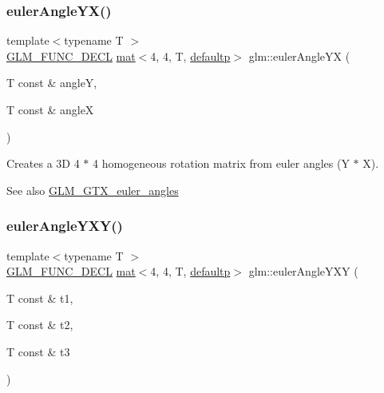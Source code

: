 \subsubsection{\texorpdfstring{euler\+Angle\+Y\+X()}{eulerAngleYX()}}
{\footnotesize\ttfamily template$<$typename T $>$ \\
\hyperlink{setup_8hpp_ab2d052de21a70539923e9bcbf6e83a51}{G\+L\+M\+\_\+\+F\+U\+N\+C\+\_\+\+D\+E\+CL} \hyperlink{structglm_1_1mat}{mat}$<$4, 4, T, \hyperlink{namespaceglm_a36ed105b07c7746804d7fdc7cc90ff25a9d21ccd8b5a009ec7eb7677befc3bf51}{defaultp}$>$ glm\+::euler\+Angle\+YX (\begin{DoxyParamCaption}\item[{T const \&}]{angleY,  }\item[{T const \&}]{angleX }\end{DoxyParamCaption})}

Creates a 3D 4 $\ast$ 4 homogeneous rotation matrix from euler angles (Y $\ast$ X). \begin{DoxySeeAlso}{See also}
\hyperlink{group__gtx__euler__angles}{G\+L\+M\+\_\+\+G\+T\+X\+\_\+euler\+\_\+angles} 
\end{DoxySeeAlso}
\mbox{\label{group__gtx__euler__angles_ga750fba9894117f87bcc529d7349d11de}} 
\subsubsection{\texorpdfstring{euler\+Angle\+Y\+X\+Y()}{eulerAngleYXY()}}
{\footnotesize\ttfamily template$<$typename T $>$ \\
\hyperlink{setup_8hpp_ab2d052de21a70539923e9bcbf6e83a51}{G\+L\+M\+\_\+\+F\+U\+N\+C\+\_\+\+D\+E\+CL} \hyperlink{structglm_1_1mat}{mat}$<$4, 4, T, \hyperlink{namespaceglm_a36ed105b07c7746804d7fdc7cc90ff25a9d21ccd8b5a009ec7eb7677befc3bf51}{defaultp}$>$ glm\+::euler\+Angle\+Y\+XY (\begin{DoxyParamCaption}\item[{T const \&}]{t1,  }\item[{T const \&}]{t2,  }\item[{T const \&}]{t3 }\end{DoxyParamCaption})}


